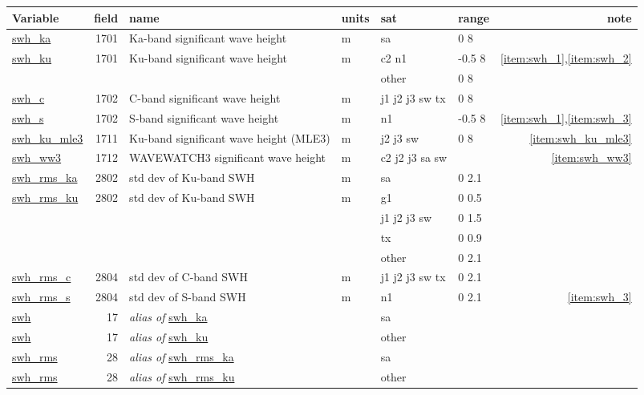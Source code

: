 \documentclass[a4paper,11pt,openany,natbib,nomargin]{thesis}
\makeatletter
\newcommand\var[1]{\url{#1}\index{variables!#1@\protect\url{#1}}}
\newcommand\alias[1]{\emph{alias of} \var{#1}}
\newenvironment{vartable}{
\begin{table}[ht]
\small
\begin{tabular}{lrllllr}
\hline
Variable & field & name & units & sat & range & note \\
\hline
}{
\hline
\end{tabular}
\end{table}
}
\makeatother
\begin{document}
\begin{vartable}
\var{swh_ka} & 1701 & Ka-band significant wave height & m & sa & 0 8 & \\
\var{swh_ku} & 1701 & Ku-band significant wave height & m & c2 n1 & -0.5 8 & \ref{item:swh_1},\ref{item:swh_2} \\
& & & & other & 0 8 & \\
\var{swh_c} & 1702 & C-band significant wave height & m & j1 j2 j3 sw tx & 0 8 & \\
\var{swh_s} & 1702 & S-band significant wave height & m & n1 & -0.5 8 & \ref{item:swh_1},\ref{item:swh_3} \\
\var{swh_ku_mle3} & 1711 & Ku-band significant wave height (MLE3) & m & j2 j3 sw & 0 8 & \ref{item:swh_ku_mle3} \\
\hline
\var{swh_ww3} & 1712 & WAVEWATCH3 significant wave height & m & c2 j2 j3 sa sw & & \ref{item:swh_ww3} \\
\hline
\var{swh_rms_ka} & 2802 & std dev of Ku-band SWH & m & sa & 0 2.1 & \\
\var{swh_rms_ku} & 2802 & std dev of Ku-band SWH & m & g1 & 0 0.5 & \\
& & & & j1 j2 j3 sw & 0 1.5 & \\
& & & & tx & 0 0.9 & \\
& & & & other & 0 2.1 & \\
\var{swh_rms_c} & 2804 & std dev of C-band SWH & m & j1 j2 j3 sw tx & 0 2.1 & \\
\var{swh_rms_s} & 2804 & std dev of S-band SWH & m & n1 & 0 2.1 & \ref{item:swh_3} \\
\hline
\var{swh} & 17 & \alias{swh_ka} && sa && \\
\var{swh} & 17 & \alias{swh_ku} && other && \\
\hline
\var{swh_rms} & 28 & \alias{swh_rms_ka} && sa && \\
\var{swh_rms} & 28 & \alias{swh_rms_ku} && other && \\
\end{vartable}
\end{document}
